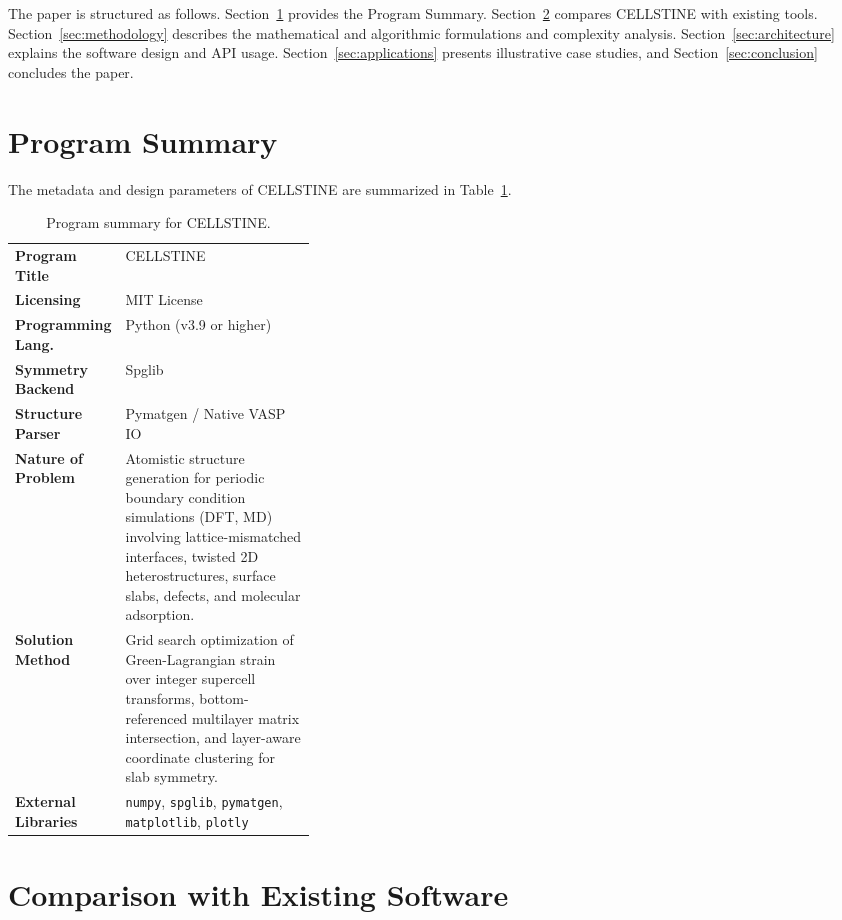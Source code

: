 \documentclass[9pt,a4paper,twoside]{tau-class/tau}
\begin{document}
The paper is structured as follows. Section~\ref{sec:summary} provides the Program Summary. Section~\ref{sec:comparison} compares CELLSTINE with existing tools. Section~\ref{sec:methodology} describes the mathematical and algorithmic formulations and complexity analysis. Section~\ref{sec:architecture} explains the software design and API usage. Section~\ref{sec:applications} presents illustrative case studies, and Section~\ref{sec:conclusion} concludes the paper.

\section{Program Summary}
\label{sec:summary}

The metadata and design parameters of CELLSTINE are summarized in Table~\ref{tab:program_summary}.

\begin{table}[H]
\small
\caption{Program summary for CELLSTINE.}
\label{tab:program_summary}
\begin{tabularx}{\linewidth}{@{}p{0.35\linewidth}X@{}}
\toprule
\textbf{Program Title} & CELLSTINE \\
\textbf{Licensing} & MIT License \\
\textbf{Programming Lang.} & Python (v3.9 or higher) \\
\textbf{Symmetry Backend} & Spglib \\
\textbf{Structure Parser} & Pymatgen / Native VASP IO \\
\textbf{Nature of Problem} & Atomistic structure generation for periodic boundary condition simulations (DFT, MD) involving lattice-mismatched interfaces, twisted 2D heterostructures, surface slabs, defects, and molecular adsorption. \\
\textbf{Solution Method} & Grid search optimization of Green-Lagrangian strain over integer supercell transforms, bottom-referenced multilayer matrix intersection, and layer-aware coordinate clustering for slab symmetry. \\
\textbf{External Libraries} & \texttt{numpy}, \texttt{spglib}, \texttt{pymatgen}, \texttt{matplotlib}, \texttt{plotly} \\
\bottomrule
\end{tabularx}
\end{table}

\section{Comparison with Existing Software}
\label{sec:comparison}
\end{document}
